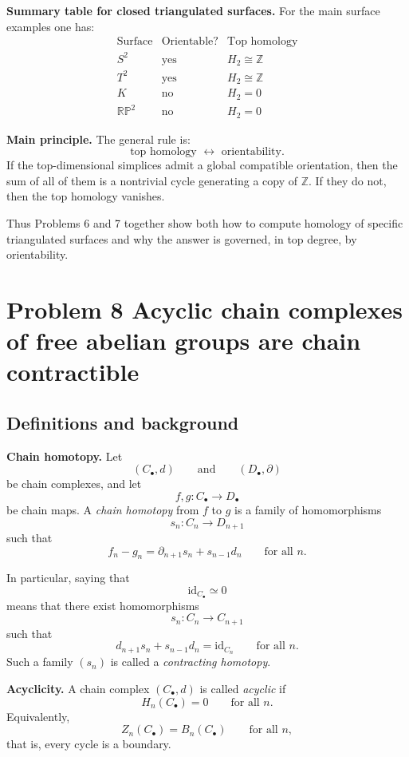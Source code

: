 \documentclass[12pt,a4paper]{article}
\theoremstyle{notespace}
\begin{document}
\bigskip

\textbf{Summary table for closed triangulated surfaces.}
For the main surface examples one has:
\[
\begin{array}{c|c|c}
	\text{Surface} & \text{Orientable?} & \text{Top homology} \\
	\hline
	S^2 & \text{yes} & H_2\cong \mathbb Z \\
	T^2 & \text{yes} & H_2\cong \mathbb Z \\
	K & \text{no} & H_2=0 \\
	\mathbb{RP}^2 & \text{no} & H_2=0
\end{array}
\]

\medskip

\textbf{Main principle.}
The general rule is:
\[
\text{top homology } \longleftrightarrow \text{ orientability}.
\]
If the top-dimensional simplices admit a global compatible orientation, then the sum of all of them is a nontrivial cycle generating a copy of \(\mathbb Z\). If they do not, then the top homology vanishes.

Thus Problems 6 and 7 together show both how to compute homology of specific triangulated surfaces and why the answer is governed, in top degree, by orientability.

\section{Problem 8 Acyclic chain complexes of free abelian groups are chain contractible}

\subsection{Definitions and background}

\textbf{Chain homotopy.}
Let
\[
(C_\bullet,d)
\qquad\text{and}\qquad
(D_\bullet,\partial)
\]
be chain complexes, and let
\[
f,g:C_\bullet\to D_\bullet
\]
be chain maps. A \emph{chain homotopy} from \(f\) to \(g\) is a family of homomorphisms
\[
s_n:C_n\to D_{n+1}
\]
such that
\[
f_n-g_n=\partial_{n+1}s_n+s_{n-1}d_n
\qquad\text{for all }n.
\]

In particular, saying that
\[
\mathrm{id}_{C_\bullet}\simeq 0
\]
means that there exist homomorphisms
\[
s_n:C_n\to C_{n+1}
\]
such that
\[
d_{n+1}s_n+s_{n-1}d_n=\mathrm{id}_{C_n}
\qquad\text{for all }n.
\]
Such a family \((s_n)\) is called a \emph{contracting homotopy}.

\medskip

\textbf{Acyclicity.}
A chain complex \((C_\bullet,d)\) is called \emph{acyclic} if
\[
H_n(C_\bullet)=0
\qquad\text{for all }n.
\]
Equivalently,
\[
Z_n(C_\bullet)=B_n(C_\bullet)
\qquad\text{for all }n,
\]
that is, every cycle is a boundary.
\end{document}
